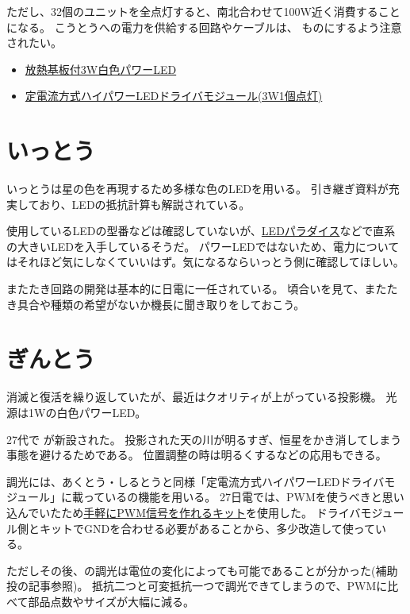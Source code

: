 \documentclass[letterpaper,10pt,dvipdfmx]{sphinxmanual}
\begin{document}
ただし、32個のユニットを全点灯すると、南北合わせて100W近く消費することになる。
こうとうへの電力を供給する回路やケーブルは、
ものにするよう注意されたい。

\begin{itemize}
\item {} 
\href{http://akizukidenshi.com/catalog/g/gI-08956/}{放熱基板付3W白色パワーLED}

\item {} 
\href{http://akizukidenshi.com/catalog/g/gM-04487/}{定電流方式ハイパワーLEDドライバモジュール(3W1個点灯)}

\end{itemize}


\section{いっとう}
\label{\detokenize{syutou:id4}}
いっとうは星の色を再現するため多様な色のLEDを用いる。
引き継ぎ資料が充実しており、LEDの抵抗計算も解説されている。

使用しているLEDの型番などは確認していないが、\href{http://www.led-paradise.com/}{LEDパラダイス}などで直系の大きいLEDを入手しているそうだ。
パワーLEDではないため、電力についてはそれほど気にしなくていいはず。気になるならいっとう側に確認してほしい。

またたき回路の開発は基本的に日電に一任されている。
頃合いを見て、またたき具合や種類の希望がないか機長に聞き取りをしておこう。


\section{ぎんとう}
\label{\detokenize{syutou:id5}}
消滅と復活を繰り返していたが、最近はクオリティが上がっている投影機。
光源は1Wの白色パワーLED。

27代で が新設された。
投影された天の川が明るすぎ、恒星をかき消してしまう事態を避けるためである。
位置調整の時は明るくするなどの応用もできる。

調光には、あくとう・しるとうと同様「定電流方式ハイパワーLEDドライバモジュール」に載っているの機能を用いる。
27日電では、PWMを使うべきと思い込んでいたため\href{http://akizukidenshi.com/catalog/g/gK-06244/}{手軽にPWM信号を作れるキット}を使用した。
ドライバモジュール側とキットでGNDを合わせる必要があることから、多少改造して使っている。

ただしその後、の調光は電位の変化によっても可能であることが分かった(補助投の記事参照)。
抵抗二つと可変抵抗一つで調光できてしまうので、PWMに比べて部品点数やサイズが大幅に減る。
\end{document}
